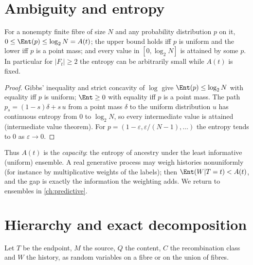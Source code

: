 \section{Ambiguity and entropy}
\begin{proposition}\label{prop:entropy-bounds}
For a nonempty finite fibre of size $N$ and any probability distribution $p$ on it, $0\le\Ent(p)\le\log_2N=A(t)$; the upper bound holds iff $p$ is uniform and the lower iff $p$ is a point mass; and every value in $[0,\log_2 N]$ is attained by some $p$. In particular for $|F_t|\ge2$ the entropy can be arbitrarily small while $A(t)$ is fixed.
\end{proposition}
\begin{proof}
Gibbs' inequality and strict concavity of $\log$ give $\Ent(p)\le\log_2N$ with equality iff $p$ is uniform; $\Ent\ge0$ with equality iff $p$ is a point mass. The path $p_s=(1-s)\delta+s\,u$ from a point mass $\delta$ to the uniform distribution $u$ has continuous entropy from $0$ to $\log_2N$, so every intermediate value is attained (intermediate value theorem). For $p=(1-\varepsilon,\varepsilon/(N-1),\dots)$ the entropy tends to $0$ as $\varepsilon\to0$.
\end{proof}
Thus $A(t)$ is the \emph{capacity}: the entropy of ancestry under the least informative (uniform) ensemble. A real generative process may weigh histories nonuniformly (for instance by multiplicative weights of the labels); then $\Ent(W|T=t)<A(t)$, and the gap is exactly the information the weighting adds. We return to ensembles in \cref{ch:predictive}.

\section{Hierarchy and exact decomposition}
Let $T$ be the endpoint, $M$ the source, $Q$ the content, $C$ the recombination class and $W$ the history, as random variables on a fibre or on the union of fibres.

